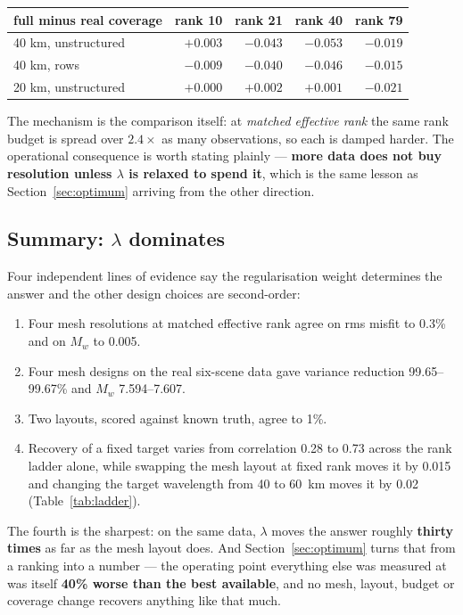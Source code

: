 \documentclass[11pt,a4paper]{article}
\begin{document}
\begin{center}
\small
\begin{tabular}{lrrrr}
\toprule
full minus real coverage & rank 10 & rank 21 & rank 40 & rank 79 \\
\midrule
40 km, unstructured & $+0.003$ & $-0.043$ & $-0.053$ & $-0.019$ \\
40 km, rows         & $-0.009$ & $-0.040$ & $-0.046$ & $-0.015$ \\
20 km, unstructured & $+0.000$ & $+0.002$ & $+0.001$ & $-0.021$ \\
\bottomrule
\end{tabular}
\end{center}

\noindent
The mechanism is the comparison itself: at \emph{matched effective rank} the same
rank budget is spread over $2.4\times$ as many observations, so each is damped
harder. The operational consequence is worth stating plainly --- \textbf{more
data does not buy resolution unless $\lambda$ is relaxed to spend it}, which is
the same lesson as Section~\ref{sec:optimum} arriving from the other direction.

\subsection{Summary: \texorpdfstring{$\lambda$}{lambda} dominates}

Four independent lines of evidence say the regularisation weight determines the
answer and the other design choices are second-order:

\begin{enumerate}\itemsep2pt
\item Four mesh resolutions at matched effective rank agree on rms misfit to
      0.3\% and on $M_w$ to 0.005.
\item Four mesh designs on the real six-scene data gave variance reduction
      99.65--99.67\% and $M_w$ 7.594--7.607.
\item Two layouts, scored against known truth, agree to 1\%.
\item Recovery of a fixed target varies from correlation 0.28 to 0.73 across the
      rank ladder alone, while swapping the mesh layout at fixed rank moves it by
      0.015 and changing the target wavelength from 40 to 60~km moves it by 0.02
      (Table~\ref{tab:ladder}).
\end{enumerate}

\noindent
The fourth is the sharpest: on the same data, $\lambda$ moves the answer roughly
\textbf{thirty times} as far as the mesh layout does. And
Section~\ref{sec:optimum} turns that from a ranking into a number ---
the operating point everything else was measured at was itself
\textbf{40\% worse than the best available}, and no mesh, layout, budget or
coverage change recovers anything like that much.
\end{document}
